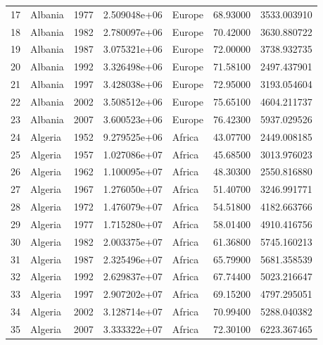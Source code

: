 \documentclass[
  letterpaper,
  DIV=11,
  numbers=noendperiod]{scrreprt}
\begin{document}
\begin{tabular}{llrrlrr}
17   &                   Albania &  1977 &  2.509048e+06 &    Europe &  68.93000 &    3533.003910 \\
18   &                   Albania &  1982 &  2.780097e+06 &    Europe &  70.42000 &    3630.880722 \\
19   &                   Albania &  1987 &  3.075321e+06 &    Europe &  72.00000 &    3738.932735 \\
20   &                   Albania &  1992 &  3.326498e+06 &    Europe &  71.58100 &    2497.437901 \\
21   &                   Albania &  1997 &  3.428038e+06 &    Europe &  72.95000 &    3193.054604 \\
22   &                   Albania &  2002 &  3.508512e+06 &    Europe &  75.65100 &    4604.211737 \\
23   &                   Albania &  2007 &  3.600523e+06 &    Europe &  76.42300 &    5937.029526 \\
24   &                   Algeria &  1952 &  9.279525e+06 &    Africa &  43.07700 &    2449.008185 \\
25   &                   Algeria &  1957 &  1.027086e+07 &    Africa &  45.68500 &    3013.976023 \\
26   &                   Algeria &  1962 &  1.100095e+07 &    Africa &  48.30300 &    2550.816880 \\
27   &                   Algeria &  1967 &  1.276050e+07 &    Africa &  51.40700 &    3246.991771 \\
28   &                   Algeria &  1972 &  1.476079e+07 &    Africa &  54.51800 &    4182.663766 \\
29   &                   Algeria &  1977 &  1.715280e+07 &    Africa &  58.01400 &    4910.416756 \\
30   &                   Algeria &  1982 &  2.003375e+07 &    Africa &  61.36800 &    5745.160213 \\
31   &                   Algeria &  1987 &  2.325496e+07 &    Africa &  65.79900 &    5681.358539 \\
32   &                   Algeria &  1992 &  2.629837e+07 &    Africa &  67.74400 &    5023.216647 \\
33   &                   Algeria &  1997 &  2.907202e+07 &    Africa &  69.15200 &    4797.295051 \\
34   &                   Algeria &  2002 &  3.128714e+07 &    Africa &  70.99400 &    5288.040382 \\
35   &                   Algeria &  2007 &  3.333322e+07 &    Africa &  72.30100 &    6223.367465 \\

\end{tabular}
\end{document}
